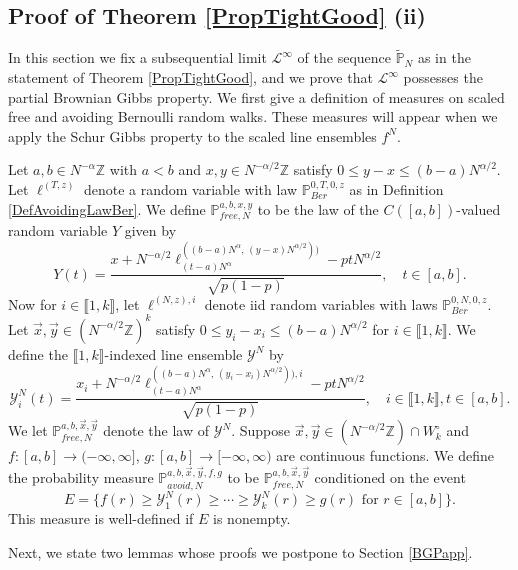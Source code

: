 \subsection{Proof of Theorem \ref{PropTightGood} (ii)}

In this section we fix a subsequential limit $\mathcal{L}^\infty$ of the sequence $\tilde{\mathbb{P}}_N$ as in the statement of Theorem \ref{PropTightGood}, and we prove that $\mathcal{L}^\infty$ possesses the partial Brownian Gibbs property. We first give a definition of measures on scaled free and avoiding Bernoulli random walks. These measures will appear when we apply the Schur Gibbs property to the scaled line ensembles $f^N$.

\begin{definition}\label{scaledRW}
	Let $a,b\in N^{-\alpha}\mathbb{Z}$ with $a<b$ and $x,y\in N^{-\alpha/2}\mathbb{Z}$ satisfy $0\leq y-x \leq (b-a)N^{\alpha/2}$. Let $\ell^{(T,z)}$ denote a random variable with law $\mathbb{P}^{0,T,0,z}_{Ber}$ as in Definition \ref{DefAvoidingLawBer}. We define $\mathbb{P}^{a,b,x,y}_{free,N}$ to be the law of the $C([a,b])$-valued random variable $Y$ given by
	\[
	Y(t) = \frac{x + N^{-\alpha/2}\ell^{((b-a)N^\alpha,\,(y-x)N^{\alpha/2}))}_{(t-a)N^\alpha} - ptN^{\alpha/2}}{\sqrt{p(1-p)}}, \quad t\in [a,b].
	\]
	Now for $i\in\llbracket 1,k\rrbracket$, let $\ell^{(N,z),i}$ denote iid random variables with laws $\mathbb{P}^{0,N,0,z}_{Ber}$. Let $\vec{x},\vec{y}\in(N^{-\alpha/2}\mathbb{Z})^k$ satisfy $0\leq y_i-x_i \leq (b-a)N^{\alpha/2}$ for $i\in\llbracket 1,k\rrbracket$. We define the $\llbracket 1,k\rrbracket$-indexed line ensemble $\mathcal{Y}^N$ by
	\[
	\mathcal{Y}^N_i(t) = \frac{x_i + N^{-\alpha/2}\ell^{((b-a)N^\alpha,\,(y_i-x_i)N^{\alpha/2})),i}_{(t-a)N^\alpha} - ptN^{\alpha/2}}{\sqrt{p(1-p)}}, \quad i\in\llbracket 1,k\rrbracket, t\in [a,b].
	\]
	We let $\mathbb{P}^{a,b,\vec{x},\vec{y}}_{free,N}$ denote the law of $\mathcal{Y}^N$. Suppose $\vec{x},\vec{y}\in (N^{-\alpha/2}\mathbb{Z})\cap W_k^\circ$ and $f : [a,b] \to (-\infty,\infty]$, $g:[a,b]\to [-\infty,\infty)$ are continuous functions. We define the probability measure $\mathbb{P}^{a,b,\vec{x},\vec{y},f,g}_{avoid,N}$ to be $\mathbb{P}^{a,b,\vec{x},\vec{y}}_{free,N}$ conditioned on the event
	\[
	E = \{f(r) \geq \mathcal{Y}^N_1(r) \geq \cdots \geq \mathcal{Y}^N_k(r) \geq g(r) \mbox{ for } r\in[a,b]\}.
	\]
	This measure is well-defined if $E$ is nonempty.
	
\end{definition}

Next, we state two lemmas whose proofs we postpone to Section \ref{BGPapp}. 

